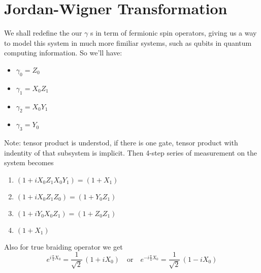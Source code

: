 \documentclass{article}
\begin{document}
\section{Jordan-Wigner Transformation} %
\label{sec:Jordan-Wigner Transformation}
We shall redefine the our $ \gamma $ s in term of fermionic spin operators, giving us a way to model
this system in much more fimiliar systems, such as qubits in quantum computing information. So we'll have:
\begin{itemize}
	\item $ \gamma_0 = Z_0 $
	\item $ \gamma_1 = X_0 Z_1 $
	\item $ \gamma_2 = X_0 Y_1 $
	\item $ \gamma_3 = Y_0 $
\end{itemize}
Note: tensor product is understod, if there is one gate, tensor product with indentity of that subsystem is implicit.
Then 4-step series of measurement on the system becomes
\begin{enumerate}
	\item $ (1 + i X_0 Z_1 X_0 Y_1) = (1 + X_1) $
	\item $ (1 + i X_0 Z_1 Z_0) = (1 + Y_0 Z_1) $
	\item $ (1 + i Y_0 X_0 Z_1) = (1 + Z_0 Z_1) $
	\item $ (1 + X_1) $
\end{enumerate}
Also for true braiding operator we get
\begin{equation}
	e^{i \frac{\pi}{4} X_0} = \frac{1}{\sqrt{2}}\, (1 + i X_0 ) \quad \text{or} \quad
	e^{-i \frac{\pi}{4} X_0} = \frac{1}{\sqrt{2}}\, (1 - i X_0 )
	\label{eq:br Jordan-Wigner}
\end{equation}
\end{document}
